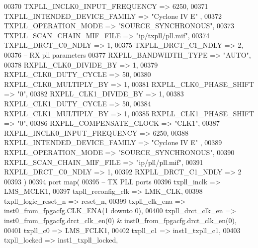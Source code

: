 \begin{DoxyCode}
00370       TXPLL_INCLK0_INPUT_FREQUENCY  => \textcolor{vhdllogic}{6250},
00371       TXPLL_INTENDED_DEVICE_FAMILY  => \textcolor{keyword}{"Cyclone IV E"}  ,
00372       TXPLL_OPERATION_MODE          => \textcolor{keyword}{"SOURCE\_SYNCHRONOUS"},
00373       TXPLL_SCAN_CHAIN_MIF_FILE     => \textcolor{keyword}{"ip/txpll/pll.mif"},
00374       TXPLL_DRCT_C0_NDLY            => \textcolor{vhdllogic}{1},
00375       TXPLL_DRCT_C1_NDLY            => \textcolor{vhdllogic}{2},
00376 \textcolor{keyword}{      -- RX pll parameters         }
00377       RXPLL_BANDWIDTH_TYPE          => \textcolor{keyword}{"AUTO"},
00378       RXPLL_CLK0_DIVIDE_BY          => \textcolor{vhdllogic}{1},
00379       RXPLL_CLK0_DUTY_CYCLE         => \textcolor{vhdllogic}{50},
00380       RXPLL_CLK0_MULTIPLY_BY        => \textcolor{vhdllogic}{1},
00381       RXPLL_CLK0_PHASE_SHIFT        => "\textcolor{vhdllogic}{0}",
00382       RXPLL_CLK1_DIVIDE_BY          => \textcolor{vhdllogic}{1},
00383       RXPLL_CLK1_DUTY_CYCLE         => \textcolor{vhdllogic}{50},
00384       RXPLL_CLK1_MULTIPLY_BY        => \textcolor{vhdllogic}{1},
00385       RXPLL_CLK1_PHASE_SHIFT        => "\textcolor{vhdllogic}{0}",
00386       RXPLL_COMPENSATE_CLOCK        => \textcolor{keyword}{"CLK1"},
00387       RXPLL_INCLK0_INPUT_FREQUENCY  => \textcolor{vhdllogic}{6250},
00388       RXPLL_INTENDED_DEVICE_FAMILY  => \textcolor{keyword}{"Cyclone IV E"}  ,
00389       RXPLL_OPERATION_MODE          => \textcolor{keyword}{"SOURCE\_SYNCHRONOUS"},
00390       RXPLL_SCAN_CHAIN_MIF_FILE     => \textcolor{keyword}{"ip/pll/pll.mif"},
00391       RXPLL_DRCT_C0_NDLY            => \textcolor{vhdllogic}{1},
00392       RXPLL_DRCT_C1_NDLY            => \textcolor{vhdllogic}{2}
00393    \textcolor{vhdlchar}{)}
00394    \textcolor{keywordflow}{port} \textcolor{keywordflow}{map}(
00395 \textcolor{keyword}{      -- TX PLL ports}
00396       txpll_inclk          => LMS_MCLK1,
00397       txpll_reconfig_clk   => LMK_CLK,
00398       txpll_logic_reset_n  => reset_n,
00399       txpll_clk_ena        => inst0\_from\_fpgacfg.CLK\_ENA\textcolor{vhdlchar}{(}\textcolor{vhdllogic}{1} \textcolor{keywordflow}{downto} \textcolor{vhdllogic}{0}\textcolor{vhdlchar}{)},
00400       txpll_drct_clk_en    => inst0\_from\_fpgacfg.drct\_clk\_en\textcolor{vhdlchar}{(}\textcolor{vhdllogic}{0}\textcolor{vhdlchar}{)} & 
      inst0_from_fpgacfg.drct_clk_en\textcolor{vhdlchar}{(}\textcolor{vhdllogic}{0}\textcolor{vhdlchar}{)},
00401       txpll_c0             => LMS_FCLK1,
00402       txpll_c1             => inst1_txpll_c1,
00403       txpll_locked         => inst1_txpll_locked,

\end{DoxyCode}
